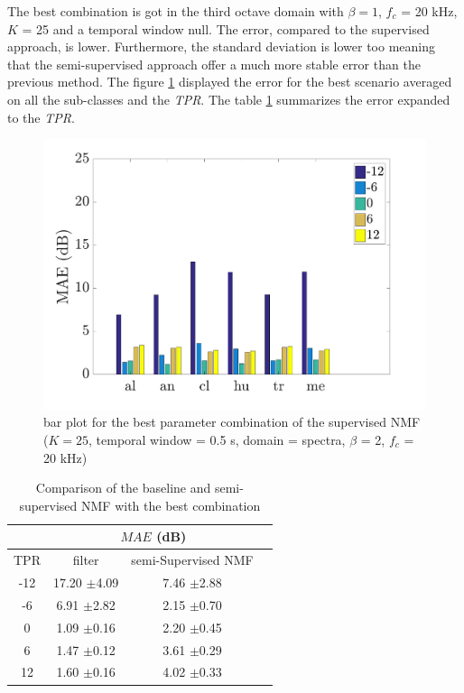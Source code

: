 \documentclass[twocolumn,a4paper,10pt]{article}
\begin{document}
The best combination is got in the third octave domain with $\beta = 1$, $f_c$ = 20 kHz, $K$ = 25 and a temporal window null. The error, compared to the supervised approach, is lower. Furthermore, the standard deviation is lower too meaning that the semi-supervised approach offer a much more stable error than the previous method. The figure \ref{fig:nmfSemiSupervisedAmbiance} displayed the error for the best scenario averaged on all the sub-classes and the \textit{TPR}. The table \ref{tab:comparisonFilterSemiSupervised} summarizes the error expanded to the \textit{TPR}.

\begin{figure}[hbtp]
\centering
\includegraphics[width=\linewidth]{../image/AmbianceNmfSemiSupervised.pdf}
\caption{bar plot for the best parameter combination of the supervised NMF ($K = 25$, temporal window = 0.5 s, domain = spectra, $\beta$ = 2, $f_c$ = 20 kHz)}
\label{fig:nmfSemiSupervisedAmbiance}
\end{figure}

\begin{table}
\centering
\begin{tabular}{cccc}
    & \multicolumn{2}{c}{$MAE$ (dB)} \\ \hline
TPR & filter & semi-Supervised NMF \\ \hline
 -12 & 17.20 $\pm$4.09 &  7.46 $\pm$2.88 \\
 -6 &  6.91 $\pm$2.82 & 2.15 $\pm$0.70\\
 0 & 1.09 $\pm$0.16 &  2.20 $\pm$0.45\\
 6 &  1.47 $\pm$0.12 &  3.61 $\pm$0.29\\
 12 &  1.60 $\pm$0.16 &  4.02 $\pm$0.33\\
\end{tabular}
\caption{Comparison of the baseline and semi-supervised NMF with the best combination}
\label{tab:comparisonFilterSemiSupervised}
\end{table}
\end{document}
